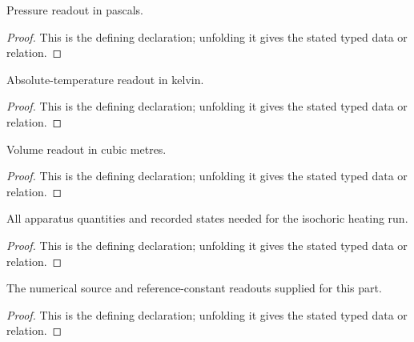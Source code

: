\begin{definition}[pressurePascal]
  \label{decl:physics:IPhO_2026_4_A_5:pressurePascal}
  Pressure readout in pascals.
\end{definition}
\begin{proof}
  This is the defining declaration; unfolding it gives the stated typed data or relation.
\end{proof}

\begin{definition}[temperatureKelvin]
  \label{decl:physics:IPhO_2026_4_A_5:temperatureKelvin}
  Absolute-temperature readout in kelvin.
\end{definition}
\begin{proof}
  This is the defining declaration; unfolding it gives the stated typed data or relation.
\end{proof}

\begin{definition}[volumeCubicMeter]
  \label{decl:physics:IPhO_2026_4_A_5:volumeCubicMeter}
  Volume readout in cubic metres.
\end{definition}
\begin{proof}
  This is the defining declaration; unfolding it gives the stated typed data or relation.
\end{proof}

\begin{definition}[IsochoricAirExperiment]
  \label{decl:physics:IPhO_2026_4_A_5:IsochoricAirExperiment}
  All apparatus quantities and recorded states needed for the isochoric heating run.
\end{definition}
\begin{proof}
  This is the defining declaration; unfolding it gives the stated typed data or relation.
\end{proof}

\begin{definition}[SourceReadouts]
  \label{decl:physics:IPhO_2026_4_A_5:SourceReadouts}
  The numerical source and reference-constant readouts supplied for this part.
\end{definition}
\begin{proof}
  This is the defining declaration; unfolding it gives the stated typed data or relation.
\end{proof}

